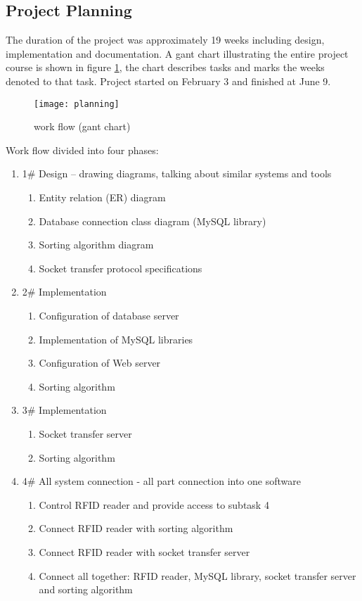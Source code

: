 \subsection{Project Planning}

The duration of the project was approximately 19 weeks including design, implementation and documentation. A gant chart illustrating the entire project course is shown in figure \ref{fig:planning}, the chart describes tasks and marks the weeks denoted to that task. Project started on February 3 and finished at June 9.

\begin{figure}[h]
	\centering
		\texttt{[image: planning]}
	\caption{work flow (gant chart)}
	\label{fig:planning}
\end{figure}

\newpage
Work flow divided into four phases:

\begin{enumerate}
  \item 1\# Design – drawing diagrams, talking about similar systems and tools
  \begin{enumerate}
    \item Entity relation (ER) diagram
    \item Database connection class diagram (MySQL library)
    \item Sorting algorithm diagram
    \item Socket transfer protocol specifications
  \end{enumerate}
  \item 2\# Implementation
  \begin{enumerate}
    \item Configuration of database server
    \item Implementation of MySQL libraries
    \item Configuration of Web server
    \item Sorting algorithm
  \end{enumerate} 
  \item 3\# Implementation
  \begin{enumerate}
    \item Socket transfer server
    \item Sorting algorithm
  \end{enumerate}
  \item 4\# All system connection - all part connection into one software
  \begin{enumerate}
    \item Control RFID reader and provide access to subtask 4
    \item Connect RFID reader with sorting algorithm
    \item Connect RFID reader with socket transfer server
    \item Connect all together: RFID reader, MySQL library, socket transfer server and sorting algorithm
  \end{enumerate} 
\end{enumerate}

